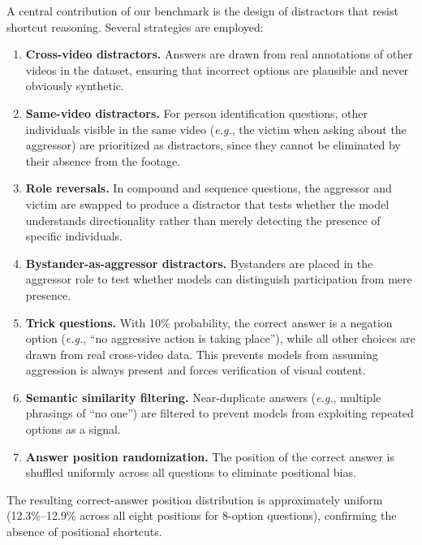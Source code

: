 A central contribution of our benchmark is the design of distractors that resist shortcut reasoning.
Several strategies are employed:
\begin{enumerate}
  \item \textbf{Cross-video distractors.} Answers are drawn from real annotations of other videos in the dataset, ensuring that incorrect options are plausible and never obviously synthetic.
  \item \textbf{Same-video distractors.} For person identification questions, other individuals visible in the same video (\textit{e.g.}, the victim when asking about the aggressor) are prioritized as distractors, since they cannot be eliminated by their absence from the footage.
  \item \textbf{Role reversals.} In compound and sequence questions, the aggressor and victim are swapped to produce a distractor that tests whether the model understands directionality rather than merely detecting the presence of specific individuals.
  \item \textbf{Bystander-as-aggressor distractors.} Bystanders are placed in the aggressor role to test whether models can distinguish participation from mere presence.
  \item \textbf{Trick questions.} With 10\% probability, the correct answer is a negation option (\textit{e.g.}, ``no aggressive action is taking place''), while all other choices are drawn from real cross-video data.
        This prevents models from assuming aggression is always present and forces verification of visual content.
  \item \textbf{Semantic similarity filtering.} Near-duplicate answers (\textit{e.g.}, multiple phrasings of ``no one'') are filtered to prevent models from exploiting repeated options as a signal.
  \item \textbf{Answer position randomization.} The position of the correct answer is shuffled uniformly across all questions to eliminate positional bias.
\end{enumerate}

The resulting correct-answer position distribution is approximately uniform (12.3\%--12.9\% across all eight positions for 8-option questions), confirming the absence of positional shortcuts. 